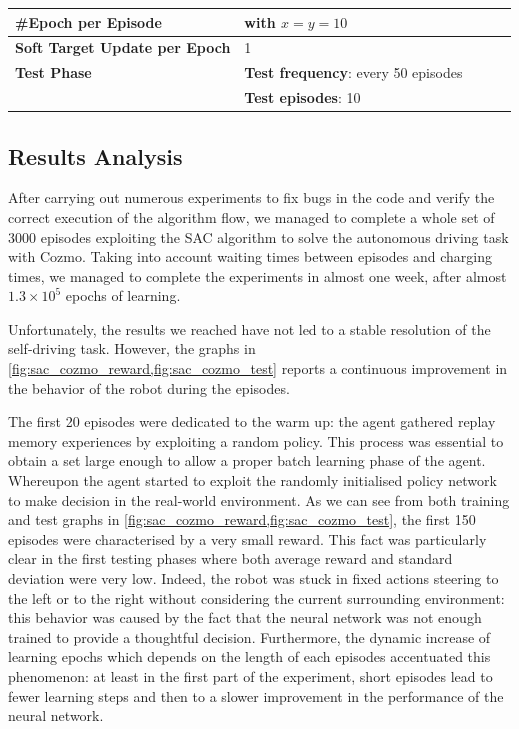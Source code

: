 \begin{table}[!h]
{\begin{tabular}{@{}lllll@{}}
			\textbf{\#Epoch per Episode}          & \Vref{eq:learning-step} with $x = y = 10$              \\\midrule
			\textbf{Soft Target Update per Epoch} & 1                                                      \\\midrule
			\textbf{Test Phase}                   & \textbf{Test frequency}: every 50 episodes             \\
			                                      & \textbf{Test episodes}: 10                             \\
			\bottomrule
		\end{tabular}}
\end{table}


\subsection{Results Analysis} \label{ch5:results}

After carrying out numerous experiments to fix bugs in the code and verify the correct execution of the algorithm flow, we managed to complete a whole set of 3000 episodes exploiting the SAC algorithm to solve the autonomous driving task with Cozmo.
Taking into account waiting times between episodes and charging times, we managed to complete the experiments in almost one week, after almost $1.3\times 10^5$ epochs of learning.

Unfortunately, the results we reached have not led to a stable resolution of the self-driving task.
However, the graphs in \vref{fig:sac_cozmo_reward,fig:sac_cozmo_test} reports a continuous improvement in the behavior of the robot during the episodes.

The first 20 episodes were dedicated to the warm up: the agent gathered replay memory experiences by exploiting a random policy.
This process was essential to obtain a set large enough to allow a proper batch learning phase of the agent.
Whereupon the agent started to exploit the randomly initialised policy network to make decision in the real-world environment.
As we can see from both training and test graphs in \vref{fig:sac_cozmo_reward,fig:sac_cozmo_test}, the first 150 episodes were characterised by a very small reward.
This fact was particularly clear in the first testing phases where both average reward and standard deviation were very low.
Indeed, the robot was stuck in fixed actions steering to the left or to the right without considering the current surrounding environment: this behavior was caused by the fact that the neural network was not enough trained to provide a thoughtful decision.
Furthermore, the dynamic increase of learning epochs which depends on the length of each episodes accentuated this phenomenon: at least in the first part of the experiment, short episodes lead to fewer learning steps and then to a slower improvement in the performance of the neural network.

